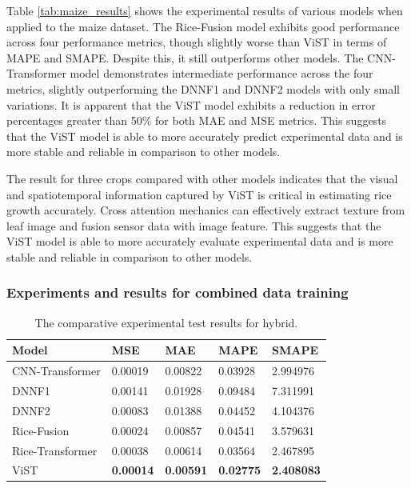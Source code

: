 \documentclass[acmsmall,manuscript, screen, review]{acmart}
\begin{document}
Table \ref{tab:maize_results} shows the experimental results of various models when applied to the maize dataset. The Rice-Fusion model exhibits good performance across four performance metrics, though slightly worse than ViST in terms of MAPE and SMAPE. Despite this, it still outperforms other models. The CNN-Transformer model demonstrates intermediate performance across the four metrics, slightly outperforming the DNNF1 and DNNF2 models with only small variations. It is apparent that the ViST model exhibits a reduction in error percentages greater than 50\% for both MAE and MSE metrics. This suggests that the ViST model is able to more accurately predict experimental data and is more stable and reliable in comparison to other models.

The result for three crops compared with other models indicates that the visual and spatiotemporal information captured by ViST is critical in estimating rice growth accurately. Cross attention mechanics can effectively extract texture from leaf image and fusion sensor data with image feature.  This suggests that the ViST model is able to more accurately evaluate experimental data and is more stable and reliable in comparison to other models.

\subsubsection{Experiments and results for combined data training}

\begin{table}[htbp]
  \centering
  \caption{The comparative experimental test results for hybrid.}
    \begin{tabular}{lllll}
    \toprule
    Model & \multicolumn{1}{l}{MSE} & \multicolumn{1}{l}{MAE} & \multicolumn{1}{l}{MAPE} & \multicolumn{1}{l}{SMAPE} \\
    \midrule
    CNN-Transformer & 0.00019 & 0.00822 & 0.03928 & 2.994976 \\
    DNNF1 & 0.00141 & 0.01928 & 0.09484 & 7.311991 \\
    DNNF2 & 0.00083 & 0.01388 & 0.04452 & 4.104376 \\
    Rice-Fusion & 0.00024 & 0.00857 & 0.04541 & 3.579631 \\
    Rice-Transformer & 0.00038 & 0.00614 & 0.03564 & 2.467895 \\
    ViST  & \textbf{0.00014} & \textbf{0.00591} & \textbf{0.02775} & \textbf{2.408083} \\
    \bottomrule
    \end{tabular}%
  \label{tab:hybrid_results}%
\end{table}%
\end{document}
